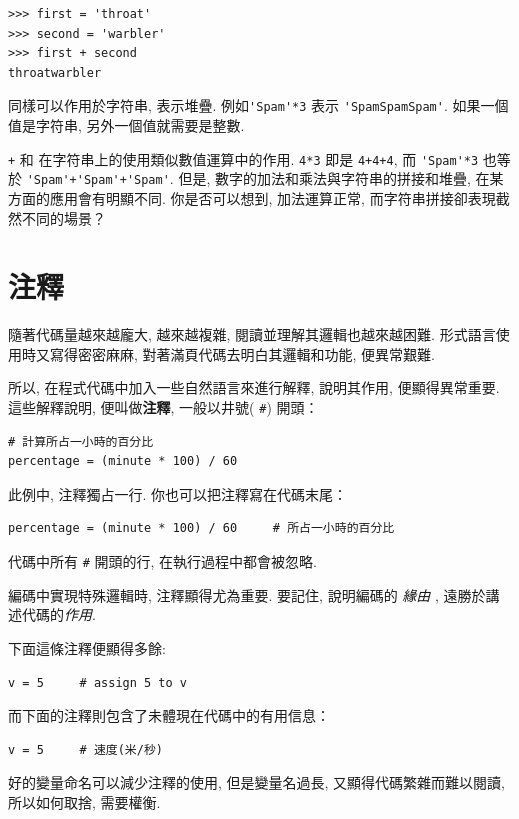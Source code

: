 \documentclass[10pt]{book}
\begin{document}
\begin{verbatim}
>>> first = 'throat'
>>> second = 'warbler'
>>> first + second
throatwarbler
\end{verbatim}
%
 {\tt *} 同樣可以作用於字符串, 表示堆疊. 例如\verb"'Spam'*3" 表示
\verb"'SpamSpamSpam'". 如果一個值是字符串, 另外一個值就需要是整數. 

{\tt +} 和 {\tt *}在字符串上的使用類似數值運算中的作用. 
 {\tt 4*3} 即是 {\tt 4+4+4}, 
而 \verb"'Spam'*3"  也等於 \verb"'Spam'+'Spam'+'Spam'". 
但是, 數字的加法和乘法與字符串的拼接和堆疊, 在某方面的應用會有明顯不同. 
你是否可以想到, 加法運算正常, 而字符串拼接卻表現截然不同的場景？



\section{注釋}

隨著代碼量越來越龐大, 越來越複雜, 閱讀並理解其邏輯也越來越困難. 
形式語言使用時又寫得密密麻麻, 對著滿頁代碼去明白其邏輯和功能, 便異常艱難. 

所以, 在程式代碼中加入一些自然語言來進行解釋, 說明其作用, 便顯得異常重要. 
這些解釋說明, 便叫做{\bf 注釋},  一般以井號( \verb"#") 開頭：

\begin{verbatim}
# 計算所占一小時的百分比
percentage = (minute * 100) / 60
\end{verbatim}
%
此例中, 注釋獨占一行. 你也可以把注釋寫在代碼末尾：

\begin{verbatim}
percentage = (minute * 100) / 60     # 所占一小時的百分比
\end{verbatim}
%
代碼中所有  {\tt \#} 開頭的行, 在執行過程中都會被忽略. 

編碼中實現特殊邏輯時, 注釋顯得尤為重要. 
要記住, 說明編碼的 {\em 緣由} , 遠勝於講述代碼的{\em 作用}. 

下面這條注釋便顯得多餘:

\begin{verbatim}
v = 5     # assign 5 to v
\end{verbatim}
%

而下面的注釋則包含了未體現在代碼中的有用信息：

\begin{verbatim}
v = 5     # 速度(米/秒) 
\end{verbatim}
%
好的變量命名可以減少注釋的使用, 但是變量名過長, 又顯得代碼繁雜而難以閱讀, 
所以如何取捨, 需要權衡. 
\end{document}
